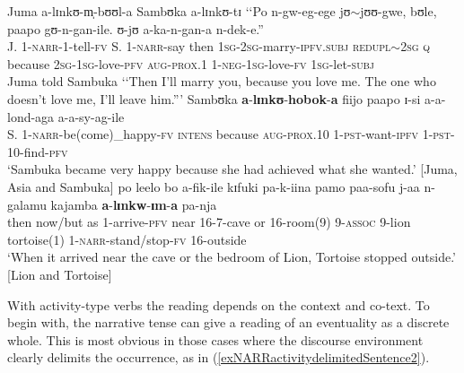 \begin{exe}
\ex\label{exNARRhoboka}
\gll Juma a-lɪnkʊ-m̩-bʊʊl-a Sambʊka a-lɪnkʊ-tɪ \lq\lq Po n-gw-eg-ege jʊ$\sim$jʊʊ-gwe, bʊle, paapo gʊ-n-gan-ile. ʊ-jʊ a-ka-n-gan-a n-dek-e.''\\
J. 1-\textsc{narr}-1-tell-\textsc{fv} S. 1-\textsc{narr}-say then \textsc{1sg}-\textsc{2sg}-marry-\textsc{ipfv.subj} \textsc{redupl}$\sim$\textsc{2sg} \textsc{q} because \textsc{2sg}-\textsc{1sg}-love-\textsc{pfv} \textsc{aug}-\textsc{prox.1} 1-\textsc{neg}-\textsc{1sg}-love-\textsc{fv} \textsc{1sg}-let-\textsc{subj}\\
\glt Juma told Sambuka \lq\lq Then I'll marry you, because you love me. The one who doesn't love me, I'll leave him.''{}'
\sn \gll Sambʊka \textbf{a}-\textbf{lɪnkʊ}-\textbf{hobok}-\textbf{a} fiijo paapo ɪ-si a-a-lond-aga a-a-sy-ag-ile\\
 S. 1-\textsc{narr}-be(come)\_happy-\textsc{fv} \textsc{intens} because \textsc{aug}-\textsc{prox.10} 1-\textsc{pst}-want-\textsc{ipfv} 1-\textsc{pst}-10-find-\textsc{pfv}\\
\glt \lq  Sambuka became very happy because she had achieved what she wanted.' [Juma, Asia and Sambuka]
\ex \label{exNARRIma} \gll po leelo bo a-fik-ile kɪfuki pa-k-iina pamo paa-sofu j-aa n-galamu kajamba \textbf{a}-\textbf{lɪnkw}-\textbf{ɪm}-\textbf{a} pa-nja\\
then now/but as 1-arrive-\textsc{pfv} near 16-7-cave or 16-room(9) 9-\textsc{assoc} 9-lion tortoise(1) 1-\textsc{narr}-stand/stop-\textsc{fv} 16-outside\\
\glt \lq When it arrived near the cave or the bedroom of Lion, Tortoise stopped outside.' [Lion and Tortoise]
\end{exe}

With activity-type verbs the reading depends on the context and co-text. To begin with, the narrative tense can give a reading of an eventuality as a discrete whole. This is most obvious in those cases where the discourse environment clearly delimits the occurrence, as in (\ref{exNARRactivitydelimitedSentence2}).

